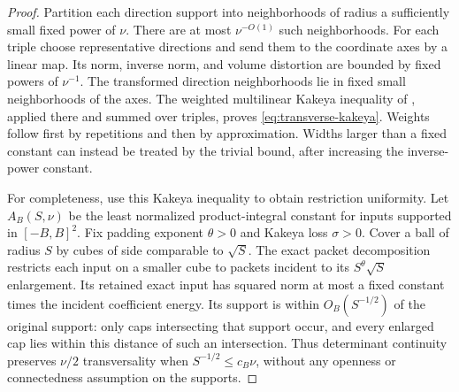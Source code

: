 \begin{proof}
Partition each direction support into neighborhoods of radius a sufficiently
small fixed power of $\nu$.  There are at most $\nu^{-O(1)}$ such
neighborhoods.  For each triple choose representative directions and send
them to the coordinate axes by a linear map.  Its norm, inverse norm,
and volume distortion are bounded by fixed powers of $\nu^{-1}$.
The transformed direction neighborhoods lie in fixed small neighborhoods
of the axes.  The weighted multilinear Kakeya inequality of
\cite[Theorem~1.15 and Remark~1.10]{BCT06}, applied there and summed over triples, proves
\eqref{eq:transverse-kakeya}.  Weights follow first by repetitions and
then by approximation.  Widths larger than a fixed constant can instead
be treated by the trivial bound, after increasing the inverse-power
constant.

For completeness, use this Kakeya inequality to obtain restriction
uniformity.  Let $A_B(S,\nu)$ be the least normalized product-integral
constant for inputs supported in $[-B,B]^2$.  Fix padding exponent
$\theta>0$ and Kakeya loss $\sigma>0$.  Cover a ball of radius $S$
by cubes of side comparable to $\sqrt S$.  The exact packet
decomposition restricts each input on a smaller cube to packets
incident to its $S^\theta\sqrt S$ enlargement.  Its retained exact
input has squared norm at most a fixed constant times the incident
coefficient energy.  Its support is within $O_B(S^{-1/2})$ of the
original support: only caps intersecting that support occur, and
every enlarged cap lies within this distance of such an intersection.
Thus determinant continuity preserves $\nu/2$ transversality when
$S^{-1/2}\le c_B\nu$, without any openness or connectedness
assumption on the supports.


\end{proof}
